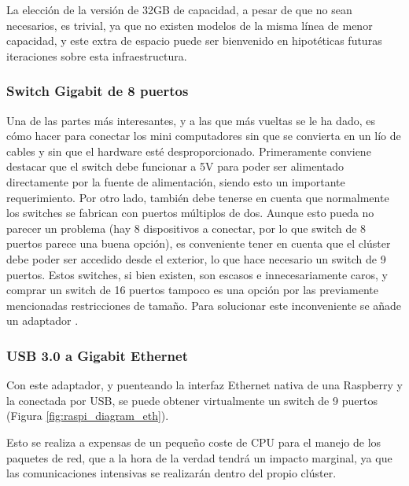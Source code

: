 La elección de la versión de 32GB de capacidad, a pesar de que no sean necesarios, es trivial, ya que no existen modelos de la misma línea de menor capacidad, y este extra de espacio puede ser bienvenido en hipotéticas futuras iteraciones sobre esta infraestructura.


\subsubsection{Switch Gigabit de 8 puertos}
Una de las partes más interesantes, y a las que más vueltas se le ha dado, es cómo hacer para conectar los mini computadores sin que se convierta en un lío de cables y sin que el hardware esté desproporcionado. Primeramente conviene destacar que el switch debe funcionar a 5V para poder ser alimentado directamente por la fuente de alimentación, siendo esto un importante requerimiento.
Por otro lado, también debe tenerse en cuenta que normalmente los switches se fabrican con puertos múltiplos de dos. Aunque esto pueda no parecer un problema (hay 8 dispositivos a conectar, por lo que switch de 8 puertos parece una buena opción), es conveniente tener en cuenta que el clúster debe poder ser accedido desde el exterior, lo que hace necesario un switch de 9 puertos. Estos switches, si bien existen, son escasos e innecesariamente caros, y comprar un switch de 16 puertos tampoco es una opción por las previamente mencionadas restricciones de tamaño. Para solucionar este inconveniente se añade un adaptador .

\subsubsection{USB 3.0 a Gigabit Ethernet}
\label{sssec:usb30_gbe}
Con este adaptador, y puenteando la interfaz Ethernet nativa de una Raspberry y la conectada por USB, se puede obtener virtualmente un switch de 9 puertos (Figura \ref{fig:raspi_diagram_eth}).

Esto se realiza a expensas de un pequeño coste de CPU para el manejo de los paquetes de red, que a la hora de la verdad tendrá un impacto marginal, ya que las comunicaciones intensivas se realizarán dentro del propio clúster.

